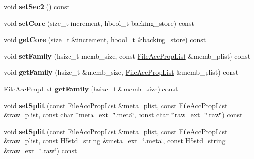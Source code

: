 \begin{DoxyCompactItemize}
void {\bfseries set\+Sec2} () const
\item 
\mbox{\label{class_h5_1_1_file_acc_prop_list_a99589c117171152687f9025f724656d5}} 
void {\bfseries set\+Core} (size\+\_\+t increment, hbool\+\_\+t backing\+\_\+store) const
\item 
\mbox{\label{class_h5_1_1_file_acc_prop_list_a9d327e85ef34e56d17b8cfb2a4648e2f}} 
void {\bfseries get\+Core} (size\+\_\+t \&increment, hbool\+\_\+t \&backing\+\_\+store) const
\item 
\mbox{\label{class_h5_1_1_file_acc_prop_list_ad4d6b076ce0c0eb19eb10670e5fad79d}} 
void {\bfseries set\+Family} (hsize\+\_\+t memb\+\_\+size, const \hyperlink{class_h5_1_1_file_acc_prop_list}{File\+Acc\+Prop\+List} \&memb\+\_\+plist) const
\item 
\mbox{\label{class_h5_1_1_file_acc_prop_list_a99744f8672857352ae5da198f5909429}} 
void {\bfseries get\+Family} (hsize\+\_\+t \&memb\+\_\+size, \hyperlink{class_h5_1_1_file_acc_prop_list}{File\+Acc\+Prop\+List} \&memb\+\_\+plist) const
\item 
\mbox{\label{class_h5_1_1_file_acc_prop_list_a3a5842d09a2fcd1f45b65bc2cf465854}} 
\hyperlink{class_h5_1_1_file_acc_prop_list}{File\+Acc\+Prop\+List} {\bfseries get\+Family} (hsize\+\_\+t \&memb\+\_\+size) const
\item 
\mbox{\label{class_h5_1_1_file_acc_prop_list_aa0a43c3dc8721a1d7a9452bd7dfb0c5e}} 
void {\bfseries set\+Split} (const \hyperlink{class_h5_1_1_file_acc_prop_list}{File\+Acc\+Prop\+List} \&meta\+\_\+plist, const \hyperlink{class_h5_1_1_file_acc_prop_list}{File\+Acc\+Prop\+List} \&raw\+\_\+plist, const char $\ast$meta\+\_\+ext=\char`\"{}.meta\char`\"{}, const char $\ast$raw\+\_\+ext=\char`\"{}.raw\char`\"{}) const
\item 
\mbox{\label{class_h5_1_1_file_acc_prop_list_a683415966f42b90acfc326139355142d}} 
void {\bfseries set\+Split} (const \hyperlink{class_h5_1_1_file_acc_prop_list}{File\+Acc\+Prop\+List} \&meta\+\_\+plist, const \hyperlink{class_h5_1_1_file_acc_prop_list}{File\+Acc\+Prop\+List} \&raw\+\_\+plist, const H5std\+\_\+string \&meta\+\_\+ext=\char`\"{}.meta\char`\"{}, const H5std\+\_\+string \&raw\+\_\+ext=\char`\"{}.raw\char`\"{}) const

\end{DoxyCompactItemize}

